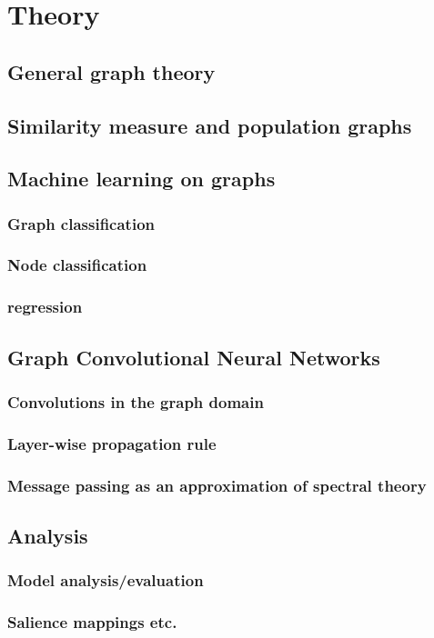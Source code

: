 \chapter{Theory}

\section{General graph theory}

\section{Similarity measure and population graphs}

\section{Machine learning on graphs}
\subsection{Graph classification}
\subsection{Node classification}
\subsection{regression}



\section{Graph Convolutional Neural Networks}
\subsection{Convolutions in the graph domain}
\subsection{Layer-wise propagation rule}
\subsection{Message passing as an approximation of spectral theory}


\section{Analysis}
\subsection{Model analysis/evaluation}
\subsection{Salience mappings etc.}


